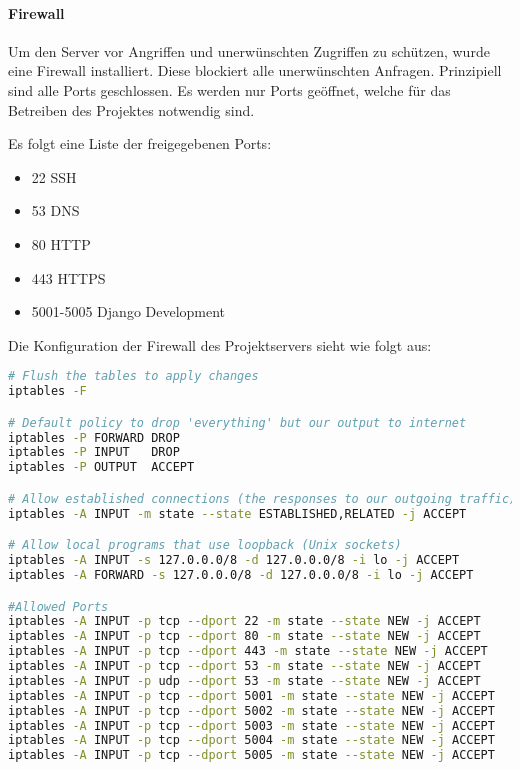 \paragraph{Firewall}
Um den Server vor Angriffen und unerwünschten Zugriffen zu schützen, wurde eine Firewall installiert. Diese blockiert alle unerwünschten Anfragen. Prinzipiell sind alle Ports geschlossen. Es werden nur Ports geöffnet, welche für das Betreiben des Projektes notwendig sind.

Es folgt eine Liste der freigegebenen Ports:
\begin{itemize}
\item 22	SSH
\item 53	\gls{DNS}
\item 80	\gls{HTTP}
\item 443	\gls{HTTPS}
\item 5001-5005 Django Development
\end{itemize}

\newpage

Die Konfiguration der Firewall des Projektservers sieht wie folgt aus:
\begin{lstlisting}[caption = Firewall Rules des Projektservers, label = firewall1, language=bash]
# Flush the tables to apply changes
iptables -F

# Default policy to drop 'everything' but our output to internet
iptables -P FORWARD DROP
iptables -P INPUT   DROP
iptables -P OUTPUT  ACCEPT

# Allow established connections (the responses to our outgoing traffic)
iptables -A INPUT -m state --state ESTABLISHED,RELATED -j ACCEPT

# Allow local programs that use loopback (Unix sockets)
iptables -A INPUT -s 127.0.0.0/8 -d 127.0.0.0/8 -i lo -j ACCEPT
iptables -A FORWARD -s 127.0.0.0/8 -d 127.0.0.0/8 -i lo -j ACCEPT

#Allowed Ports
iptables -A INPUT -p tcp --dport 22 -m state --state NEW -j ACCEPT
iptables -A INPUT -p tcp --dport 80 -m state --state NEW -j ACCEPT
iptables -A INPUT -p tcp --dport 443 -m state --state NEW -j ACCEPT
iptables -A INPUT -p tcp --dport 53 -m state --state NEW -j ACCEPT
iptables -A INPUT -p udp --dport 53 -m state --state NEW -j ACCEPT
iptables -A INPUT -p tcp --dport 5001 -m state --state NEW -j ACCEPT
iptables -A INPUT -p tcp --dport 5002 -m state --state NEW -j ACCEPT
iptables -A INPUT -p tcp --dport 5003 -m state --state NEW -j ACCEPT
iptables -A INPUT -p tcp --dport 5004 -m state --state NEW -j ACCEPT
iptables -A INPUT -p tcp --dport 5005 -m state --state NEW -j ACCEPT
\end{lstlisting}

